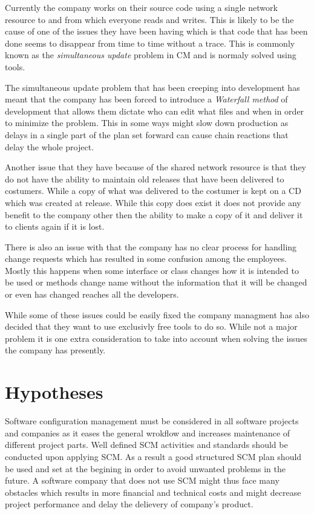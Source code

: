 \documentclass[a4paper]{article}
\begin{document}
Currently the company works on their source code using a single network resource to and from which everyone reads and writes. This is likely to be the cause of one of the issues they have been having which is that code that has been done seems to disappear from time to time without a trace. This is commonly known as the \emph{simultaneous update} problem in CM and is normaly solved using tools.

The simultaneous update problem that has been creeping into development has meant that the company has been forced to introduce a \emph{Waterfall method} of development that allows them dictate who can edit what files and when in order to minimize the problem. This in some ways might slow down production as delays in a single part of the plan set forward can cause chain reactions that delay the whole project.

Another issue that they have because of the shared network resource is that they do not have the ability to maintain old releases that have been delivered to costumers. While a copy of what was delivered to the costumer is kept on a CD which was created at release. While this copy does exist it does not provide any benefit to the company other then the ability to make a copy of it and deliver it to clients again if it is lost.

There is also an issue with that the company has no clear process for handling change requests which has resulted in some confusion among the employees. Mostly this happens when some interface or class changes how it is intended to be used or methods change name without the information that it will be changed or even has changed reaches all the developers.

While some of these issues could be easily fixed the company managment has also decided that they want to use exclusivly free tools to do so. While not a major problem it is one extra consideration to take into account when solving the issues the company has presently.

\section{Hypotheses}
Software configuration management must be considered in all software projects and companies as it eases the general wrokflow and increases maintenance of different project parts. Well defined SCM activities and standards should be conducted upon applying SCM. As a result a good structured SCM plan should be used and set at the begining in order to avoid unwanted problems in the future. A software company that does not use SCM might thus face many obstacles which results in more financial and technical costs and might decrease project performance and delay the delievery of company's product. 
\end{document}
